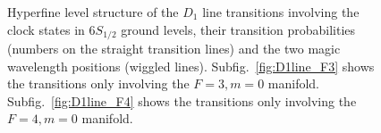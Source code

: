 \documentclass[preprint,aps,pra,onecolumn]{revtex4-1} %
\begin{document}
\begin{figure}
\centering
\begin{minipage}{.49\linewidth}
\centering
{}
\end{minipage}
\begin{minipage}{.49\linewidth}
\centering
{}
\end{minipage}
\caption{Hyperfine level structure of the $ D_1 $ line transitions involving the clock states in $ 6S_{1/2} $ ground levels, their transition probabilities (numbers on the straight transition lines) and the two magic wavelength positions (wiggled lines). 
Subfig.~\ref{fig:D1line_F3} shows the transitions only involving the $ F=3,m=0 $ manifold. Subfig.~\ref{fig:D1line_F4} shows the transitions only involving the $ F=4,m=0 $ manifold.  }
\label{fig:D1line}
\end{figure}
\end{document}
